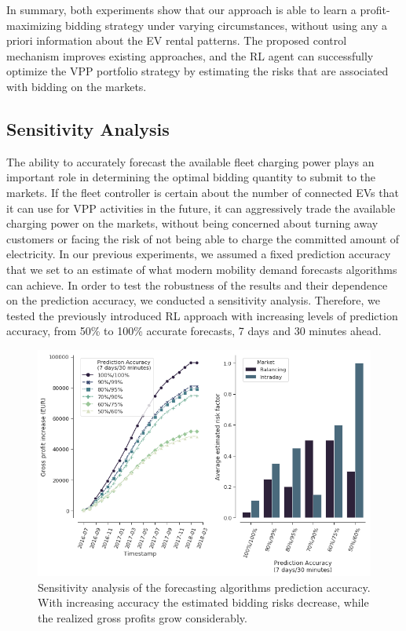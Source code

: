 \documentclass[a4paper, 12pt]{article}
\begin{document}
In summary, both experiments show that our approach is able to learn a
profit-maximizing bidding strategy under varying circumstances, without using
any a priori information about the EV rental patterns. The proposed control
mechanism improves existing approaches, and the RL agent can successfully
optimize the VPP portfolio strategy by estimating the risks that are associated
with bidding on the markets.

\subsection{Sensitivity Analysis}
\label{sec:orgde82f4f}
The ability to accurately forecast the available fleet charging power plays an
important role in determining the optimal bidding quantity to submit to the
markets. If the fleet controller is certain about the number of connected EVs
that it can use for VPP activities in the future, it can aggressively trade the
available charging power on the markets, without being concerned about turning
away customers or facing the risk of not being able to charge the committed
amount of electricity. In our previous experiments, we assumed a fixed
prediction accuracy that we set to an estimate of what modern mobility demand
forecasts algorithms can achieve. In order to test the robustness of the results
and their dependence on the prediction accuracy, we conducted a sensitivity
analysis. Therefore, we tested the previously introduced RL approach with
increasing levels of prediction accuracy, from 50\% to 100\% accurate forecasts, 7
days and 30 minutes ahead.

\begin{figure}[htb]
\centering
\includegraphics[width=1\linewidth]{fig/rl-accuracy.png}
\caption[Sensivity Analysis of Prediction Accuracy]{Sensitivity analysis of the forecasting algorithms prediction accuracy. With increasing accuracy the estimated bidding risks decrease, while the realized gross profits grow considerably. \label{fig-sens-accuracy}}
\end{figure}
\end{document}

